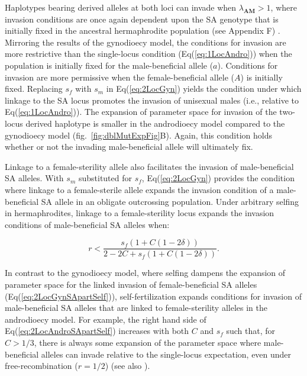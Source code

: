 \documentclass{article}
\newcommand\hl[1]{%
  \bgroup
  \hskip0pt\color{blue!80!black}%
  #1%
  \egroup
}
\begin{document}
Haplotypes bearing derived alleles at both loci can invade when $\lambda_{\mathbf{AM}} > 1$, where invasion conditions are once again dependent upon the SA genotype that is initially fixed in the ancestral hermaphrodite population \hl{(see Appendix F)}. Mirroring the results of the gynodioecy model, the conditions for invasion are more restrictive than the single-locus condition (Eq(\ref{eq:1LocAndro})) when the population is initially fixed for the male-beneficial allele ($a$). Conditions for invasion are more permissive when the female-beneficial allele ($A$) is initially fixed. Replacing $s_f$ with $s_m$ in Eq(\ref{eq:2LocGyn}) yields the condition under which linkage to the SA locus promotes the invasion of unisexual males (i.e., relative to Eq(\ref{eq:1LocAndro})). \hl{The expansion of parameter space for invasion of the two-locus derived haplotype is smaller in the androdioecy model compared to the gynodioecy model (fig.~\ref{fig:dblMutExpFig}B). Again, this condition holds whether or not the invading male-beneficial allele will ultimately fix.}

Linkage to a female-sterility allele also facilitates the invasion of male-beneficial SA alleles. \hl{With $s_m$ substituted for $s_f$, Eq(\ref{eq:2LocGyn}) provides the condition where linkage to a female-sterile allele expands the invasion condition of a male-beneficial SA allele in an obligate outcrossing population.} Under arbitrary selfing in hermaphrodites, linkage to a female-sterility locus expands the invasion conditions of male-beneficial SA alleles when:

\begin{equation}\label{eq:2LocAndroSApartSelf}
	r < \frac{s_f(1 + C (1 - 2 \delta))}{2 - 2 C + s_f(1 + C (1 - 2 \delta))}.
\end{equation}

\noindent \hl{In contrast to the gynodioecy model, where selfing dampens the expansion of parameter space for the linked invasion of female-beneficial SA alleles (Eq(\ref{eq:2LocGynSApartSelf})), self-fertilization expands conditions for invasion of male-beneficial SA alleles that are linked to female-sterility alleles in the androdioecy model. For example, the} right hand side of Eq(\ref{eq:2LocAndroSApartSelf}) increases with both $C$ and $s_f$ such that, for $C > 1/3$, there is always some expansion of the parameter space where male-beneficial alleles can invade relative to the single-locus expectation, even under free-recombination ($r = 1/2$) (see also \citealt{Olito2017}).
\end{document}
